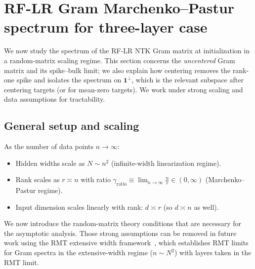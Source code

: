 \section{RF-LR Gram Marchenko–Pastur spectrum for three-layer case}\label{sec:rf-lr-gram-marchenko-pastur-spectrum-for-three-layer-case}

We now study the spectrum of the RF-LR NTK Gram matrix at initialization in a random-matrix scaling regime. This section concerns the \emph{uncentered} Gram matrix and its spike--bulk limit; we also explain how centering removes the rank-one spike and isolates the spectrum on \( \mathbf{1}^\perp \), which is the relevant subspace after centering targets (or for mean-zero targets).
We work under strong scaling and data assumptions for tractability.

\subsection{General setup and scaling}

\begin{assumption}\label{assump:RMT}
As the number of data points \(n\to\infty\):
\begin{itemize}
    \item Hidden widths scale as \( N \sim n^2 \) (infinite-width linearization regime).
    \item Rank scales as \( r \asymp n \) with ratio \( \gamma_{\mathrm{ratio}} \equiv \lim_{n\to\infty} \tfrac{n}{r} \in (0,\infty) \) (Marchenko–Pastur regime).
    \item Input dimension scales linearly with rank: \( d \asymp r \) (so \( d \asymp n \) as well).
\end{itemize}
\end{assumption}

We now introduce the random-matrix theory conditions that are necessary for the asymptotic analysis. Those strong assumptions can be removed in future work using the RMT extensive width framework~\cite{benigni2025eigenvaluedistributionneuraltangent}, which establishes RMT limits for Gram spectra in the extensive-width regime (\(n\sim N^2\)) with layers taken in the RMT limit.


